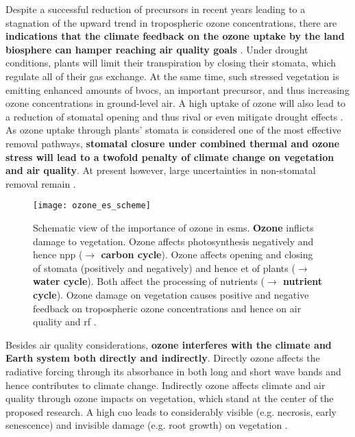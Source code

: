 Despite a successful reduction of precursors in recent years leading to a stagnation of the upward trend in tropospheric ozone concentrations, there are \textbf{indications that the climate feedback on the ozone uptake by the land biosphere can hamper reaching air quality goals} \parencite{NCC:Lin2020}. Under drought conditions, plants will limit their transpiration by closing their stomata, which regulate all of their gas exchange. At the same time, such stressed vegetation is emitting enhanced amounts of \glspl{bvoc}, an important precursor, and thus increasing ozone concentrations \ch{[O_3]} in ground-level air. A high uptake of ozone will also lead to a reduction of stomatal opening and thus rival or even mitigate drought effects \parencite{BGS:Peron2021}. As ozone uptake through plants’ stomata is considered one of the most effective removal pathways, \textbf{stomatal closure under combined thermal and ozone stress will lead to a twofold penalty of climate change on vegetation and air quality}. At present however, large uncertainties in non-stomatal removal remain \parencite{RG:Clifton2020}.

\begin{figure}[!bh]
  \centering
  \texttt{[image: ozone\_es\_scheme]}%
  \caption{Schematic view of the importance of ozone in \glspl{esm}. \textbf{\color{red}Ozone} inflicts damage to vegetation. Ozone affects photosynthesis negatively and hence \gls{npp} (\textbf{\color{darkgray}$\rightarrow$ carbon cycle}). Ozone affects opening and closing of stomata (positively and negatively) and hence \gls{et} of plants (\textbf{\color{blue}$\rightarrow$ water cycle}). Both affect the processing of nutrients (\textbf{\color{darkgray}$\rightarrow$ nutrient cycle}). Ozone damage on vegetation causes positive and negative feedback on tropospheric ozone concentrations and hence on air quality and \gls{rf} \parencite{Nat:Sitch2007}.}
  \label{fig:ozone_esm_scheme}
\end{figure}

Besides air quality considerations, \textbf{ozone interferes with the climate and Earth system both directly and indirectly}. Directly ozone affects the radiative forcing through its absorbance in both long and short wave bands and hence contributes to climate change. Indirectly ozone affects climate and air quality through ozone impacts on vegetation, which stand at the center of the proposed research. A high \gls{cuo} leads to considerably visible (e.g. necrosis, early senescence) and invisible damage (e.g. root growth) on vegetation \parencite{GCB:Mills2011}.

